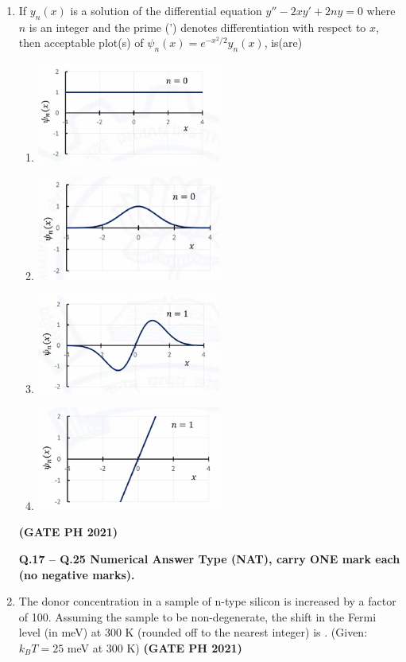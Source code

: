 \documentclass[14pt, a4paper]{extarticle}
\begin{document}
\begin{enumerate}[label=\textbf{Q.\arabic*}]
\begin{enumerate}[label=\textbf{Q.\arabic*}]
\item If $y_n(x)$ is a solution of the differential equation $y'' - 2xy' + 2ny = 0$ where $n$ is an integer and the prime (') denotes differentiation with respect to $x$, then acceptable plot(s) of $\psi_n(x) = e^{-x^2/2} y_n(x)$, is(are)
\begin{enumerate}
\item \includegraphics[width=0.5\textwidth]{figs/q26figa21.png}
\item \includegraphics[width=0.5\textwidth]{figs/q26figb21.png}
\item \includegraphics[width=0.5\textwidth]{figs/q26figc21.png}
\item \includegraphics[width=0.5\textwidth]{figs/q26figd21.png}
\end{enumerate}
\hfill \textbf{(GATE PH 2021)}

\textbf{Q.17 – Q.25 Numerical Answer Type (NAT), carry ONE mark each (no negative marks).}

\item The donor concentration in a sample of n-type silicon is increased by a factor of 100. Assuming the sample to be non-degenerate, the shift in the Fermi level (in meV) at 300 K (rounded off to the nearest integer) is \underline{\hspace{3cm}}.
(Given: $k_B T = 25$ meV at 300 K)
\hfill \textbf{(GATE PH 2021)}


\end{enumerate}
\end{enumerate}
\end{document}
